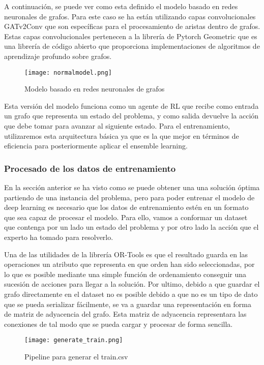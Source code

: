 A continuación, se puede ver como esta definido el modelo basado en redes neuronales de grafos.
Para este caso se ha están utilizando capas convolucionales GATv2Conv que son específicas para
el procesamiento de aristas dentro de grafos. Estas capas convolucionales pertenecen a la librería
de Pytorch Geometric \cite{pytorch-geometric} que es una librería de código abierto que proporciona
implementaciones de algoritmos de aprendizaje profundo sobre grafos. 

\begin{figure}[ht]
    \centering
    \texttt{[image: normalmodel.png]}
    \caption{Modelo basado en redes neuronales de grafos}
    \label{fig:basicmodel}
\end{figure}

Esta versión del modelo funciona como un agente de RL que recibe como entrada un grafo que representa
un estado del problema, y como salida devuelve la acción que debe tomar para avanzar al siguiente estado.
Para el entrenamiento, utilizaremos esta arquitectura básica ya que es la que mejor
en términos de eficiencia para posteriormente aplicar el ensemble learning.

\subsubsection{Procesado de los datos de entrenamiento}
En la sección anterior se ha visto como se puede obtener una una solución óptima partiendo de una 
instancia del problema, pero para poder entrenar el modelo de deep learning es necesario
que los datos de entrenamiento estén en un formato que sea capaz de procesar el modelo. Para ello,
vamos a conformar un dataset que contenga por un lado un estado del problema y por otro lado la
acción que el experto ha tomado para resolverlo.\medskip

Una de las utilidades de la librería OR-Tools es que el resultado guarda en las operaciones
un atributo que representa en que orden han sido seleccionadas, por lo que es posible mediante 
una simple función de ordenamiento conseguir una sucesión de acciones para llegar a la solución.
Por ultimo, debido a que guardar el grafo directamente en el dataset no es posible debido a que
no es un tipo de dato que se pueda serializar fácilmente, se va a guardar una representación en forma de
matriz de adyacencia del grafo. Esta matriz de adyacencia representara las conexiones de tal modo que 
se pueda cargar y procesar de forma sencilla.

\begin{figure}[ht]
    \centering
    \texttt{[image: generate\_train.png]}
    \caption{Pipeline para generar el train.csv}
    \label{fig:trainingpipeline}
\end{figure}

